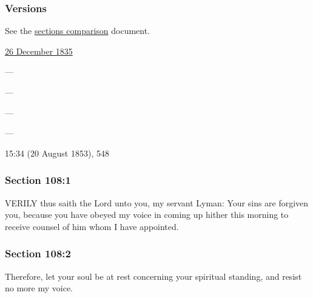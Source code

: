 	\subsubsection{Versions}
		\label{DC108-V}
		
		See the \href{https://drive.google.com/file/d/1goAvNz8jS4R8slYfMG_db55Ty2z_vmgK/view?usp=sharing}{sections comparison} document.
	
		\begin{compactdesc}
			\item[JSP] \hyperref[EMS-1835-JS-26-DEC-1835]{26 December 1835}
			\item[BC] ---
			\item[DC 1835] ---
			\item[DC 1844] ---
			\item[TS] ---
			\item[MS] 15:34 (20 August 1853), 548
		\end{compactdesc}

	\subsubsection{Section 108:1} %
		\label{DC108-1}

		VERILY thus saith the Lord unto you, my servant Lyman: Your sins are forgiven you, because you have obeyed my voice in coming up hither this morning to receive counsel of him whom I have appointed.


	\subsubsection{Section 108:2} %
		\label{DC108-2}

		Therefore, let your soul be at rest concerning your spiritual standing, and resist no more my voice.


